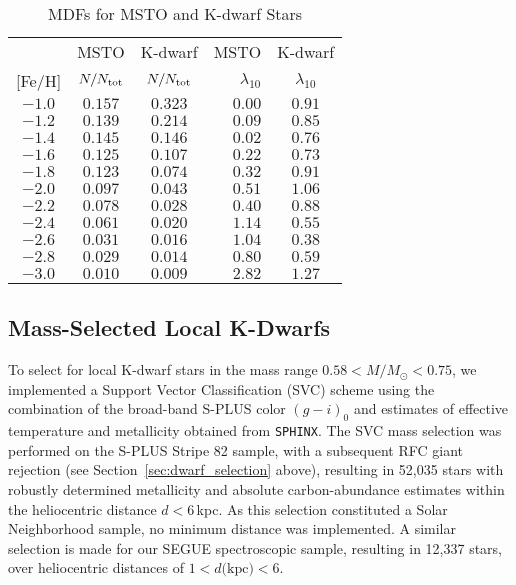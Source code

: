 \documentclass[twocolumn,trackchanges]{aastex63}
\begin{document}
\begin{table}
	\caption{MDFs for MSTO and K-dwarf Stars}             %
	\label{table:MDF_table}      %
	\centering                          %
	\begin{tabular}{c c c r c}        %
		\hline\hline                  %
		& MSTO & K-dwarf & MSTO & K-dwarf \\
		 \textrm{[Fe/H]} & $N/N_{\rm tot}$   &  $N/N_{\rm tot}$   &    $\lambda_{10} $    &  $\lambda_{10}$ \\ 
		\hline
		$-1.0$      &  $0.157$  &  $ 0.323 $   &  $  0.00 $ &  $ 0.91 $      \\
		$-1.2$      &  $0.139$  &  $ 0.214 $   &  $  0.09 $ &  $ 0.85 $        \\
		$-1.4$      &  $0.145$  &  $ 0.146 $   &  $  0.02 $ &  $ 0.76 $      \\
		$-1.6$      &  $0.125$  &  $ 0.107 $    & $  0.22 $ &  $ 0.73 $       \\
		$-1.8$      &  $0.123$  &  $ 0.074 $    & $  0.32 $ &  $ 0.91 $       \\
		$-2.0$      &  $0.097$  &  $ 0.043 $    & $  0.51 $ &  $ 1.06 $        \\
		$-2.2$      &  $0.078$  &  $ 0.028 $    & $  0.40 $ &  $ 0.88 $       \\
		$-2.4$      &  $0.061$  &  $ 0.020 $    & $  1.14 $ &  $ 0.55 $        \\
		$-2.6$      &  $0.031$  &  $ 0.016 $    & $  1.04 $ &  $ 0.38 $    \\
		$-2.8$      &  $0.029$  &  $ 0.014 $    & $  0.80 $ &  $ 0.59 $    \\
		$-3.0$      &  $0.010$  &  $ 0.009 $    & $  2.82 $ &  $ 1.27 $    \\
		\hline        
		\hline
	\end{tabular}
\end{table}



\subsection{Mass-Selected Local K-Dwarfs}

To select for local K-dwarf stars in the mass range $0.58 < M/M_{\odot} < 0.75$, we implemented a Support Vector Classification (SVC) scheme using the combination of the broad-band S-PLUS color $(g-i)_0$ and estimates of effective temperature and metallicity obtained from \texttt{SPHINX}. The SVC mass selection was performed on the S-PLUS Stripe 82 sample, with a subsequent RFC giant rejection (see Section~\ref{sec:dwarf_selection} above), resulting in 52,035 stars with robustly determined metallicity and absolute carbon-abundance estimates within the heliocentric distance $d<6$\,kpc. As this selection constituted a Solar Neighborhood sample, no minimum distance was implemented. A similar selection is made for our SEGUE spectroscopic sample, resulting in 12,337 stars, over heliocentric distances of $1 < d \textrm{(kpc)} < 6$. 
\end{document}
